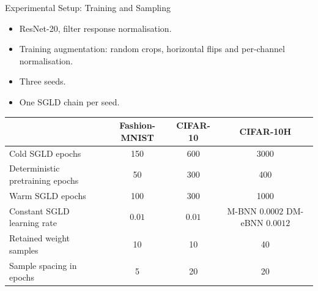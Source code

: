 \begin{frame}{Experimental Setup: Training and Sampling}
\label{frm:appendix-setup-summary}
\begin{itemize}
\item ResNet-20, filter response normalisation.
\item Training augmentation: random crops, horizontal flips and per-channel normalisation.
\item Three seeds. 
\item One SGLD chain per seed.
\end{itemize}
\begin{center}
\small
\setlength{\tabcolsep}{5pt}
\renewcommand{\arraystretch}{1.15}
\begin{tabular}{@{}lccc@{}}
\toprule
 & Fashion-MNIST & CIFAR-10 & CIFAR-10H\\
\midrule
Cold SGLD epochs & 150 & 600 & 3000\\
Deterministic pretraining epochs & 50 & 300 & 400\\
Warm SGLD epochs & 100 & 300 & 1000\\
Constant SGLD learning rate & $0.01$ & $0.01$ & \shortstack{M-BNN $0.0002$\\DM-eBNN $0.0012$}\\
Retained weight samples & 10 & 10 & 40\\
Sample spacing in epochs & 5 & 20 & 20\\
\bottomrule
\end{tabular}
\end{center}
\end{frame}


